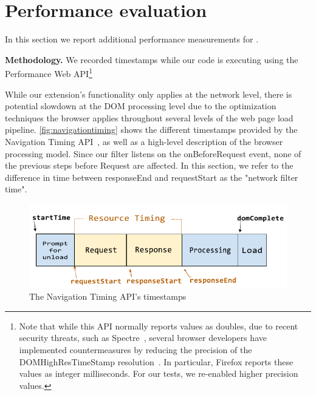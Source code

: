 \appendix

\section{Performance evaluation} \label{appendix:perf-eval}

In this section we report additional performance measurements for \sys.

\textbf{Methodology.} We recorded timestamps while our code is
executing using the Performance Web API\footnote{Note that while this
  API normally reports values as doubles, due to recent security
  threats, such as Spectre~\cite{DBLP:journals/corr/abs-1801-01203},
  several browser developers have implemented countermeasures by
  reducing the precision of the DOMHighResTimeStamp
  resolution~\cite{reducetimeprecision,resolutionconsiderations}. In
  particular, Firefox reports these values as integer
  milliseconds. For our tests, we re-enabled higher precision values.}

While our extension's functionality only applies at the network level,
there is potential slowdown at the DOM processing level due to the
optimization techniques the browser applies throughout several levels
of the web page load pipeline. \autoref{fig:navigationtiming} shows
the different timestamps provided by the Navigation Timing
API~\cite{navigationtiming}, as well as a high-level description of
the browser processing model. Since our filter listens on the
onBeforeRequest event, none of the previous steps before Request are
affected. In this section, we refer to the difference in time between
responseEnd and requestStart as the "network filter time".

\begin{figure}[h]
	\begin{center}
 \includegraphics[scale=0.65]{img/timestamp-diagram-edited.pdf}
 \end{center}
 \caption{The Navigation Timing API's timestamps\protect\footnotemark}
 \label{fig:navigationtiming}
 \end{figure}

